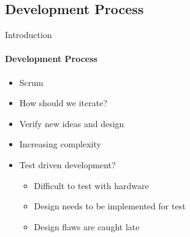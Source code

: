 \subsection{Development Process}
\begin{frame}[t]{Introduction}\framesubtitle{Development Process}
    \begin{itemize}
        \item<1-> Scrum
        \item<1-> How should we iterate?
        \item<2-> Verify new ideas and design
        \item<2-> Increasing complexity
        \item<3-> Test driven development?
        \begin{itemize}
            \item<3-> Difficult to test with hardware
            \item<3-> Design needs to be implemented for test
            \item<3-> Design flaws are caught late
        \end{itemize}
    \end{itemize}
\end{frame}

